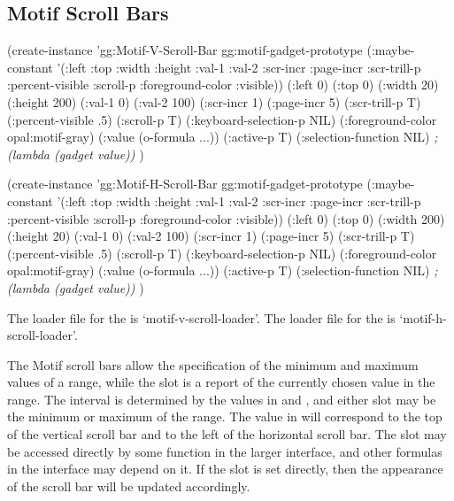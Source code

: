 \begin{group}
\section{Motif Scroll Bars}
\label{motif-scroll-bars}

\begin{programexample}
(create-instance 'gg:Motif-V-Scroll-Bar gg:motif-gadget-prototype
   (:maybe-constant '(:left :top :width :height :val-1 :val-2 :scr-incr
		      :page-incr :scr-trill-p :percent-visible :scroll-p
		      :foreground-color :visible))
   (:left 0)
   (:top 0)
   (:width 20)
   (:height 200)
   (:val-1 0)
   (:val-2 100)
   (:scr-incr 1)
   (:page-incr 5)
   (:scr-trill-p T)
   (:percent-visible .5)
   (:scroll-p T)
   (:keyboard-selection-p NIL)
   (:foreground-color opal:motif-gray)
   (:value (o-formula ...))
   (:active-p T)
   (:selection-function NIL)   {\it ; (lambda (gadget value))}
   )
\end{programexample}
\end{group}
\vspace{1 line}

\begin{group}
\begin{programexample}
(create-instance 'gg:Motif-H-Scroll-Bar gg:motif-gadget-prototype
   (:maybe-constant '(:left :top :width :height :val-1 :val-2 :scr-incr
		      :page-incr :scr-trill-p :percent-visible :scroll-p
		      :foreground-color :visible))
   (:left 0)
   (:top 0)
   (:width 200)
   (:height 20)
   (:val-1 0)
   (:val-2 100)
   (:scr-incr 1)
   (:page-incr 5)
   (:scr-trill-p T)
   (:percent-visible .5)
   (:scroll-p T)
   (:keyboard-selection-p NIL)
   (:foreground-color opal:motif-gray)
   (:value (o-formula ...))
   (:active-p T)
   (:selection-function NIL)   {\it ; (lambda (gadget value))}
   )
\end{programexample}
\end{group}

\begin{center}
\end{center}

The loader file for the
 is `motif-v-scroll-loader'.  The loader file
for the  is `motif-h-scroll-loader'.

The Motif scroll bars allow the specification of the minimum and maximum
values of a range, while the  slot is a report of the
currently chosen value in the range.  The interval is determined by
the values in  and , and either slot may be the
minimum or maximum of the range.  The value in  will
correspond to the top of the vertical scroll bar and to the left of the
horizontal scroll bar.  The  slot may be accessed directly
by some function in the larger interface, and other formulas in the
interface may depend on it.  If the  slot is set directly,
then the appearance of the scroll bar will be updated accordingly.

